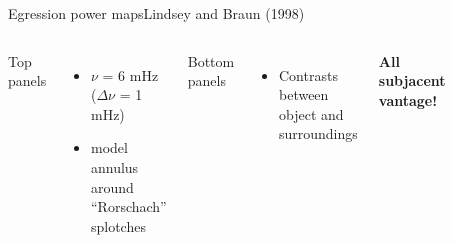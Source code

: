 \documentclass{beamer}
\begin{document}

\begin{frame}{Egression power maps}{Lindsey and Braun (1998)}
    \begin{columns}
        Top panels
        \begin{itemize}
            \item $\nu$ = 6 mHz ($\Delta\nu$ = 1 mHz)
            \item model annulus around ``Rorschach'' splotches
        \end{itemize}
        Bottom panels
        \begin{itemize}
            \item Contrasts between object and surroundings
        \end{itemize}
        \textcolor{cpink}{\textbf{All subjacent vantage!}}
        \begin{figure}
            \vspace{-1cm}
            \includegraphics[width=0.95\textwidth]{fig_5.png}
        \end{figure}
    \end{columns}
\end{frame}
\end{document}
